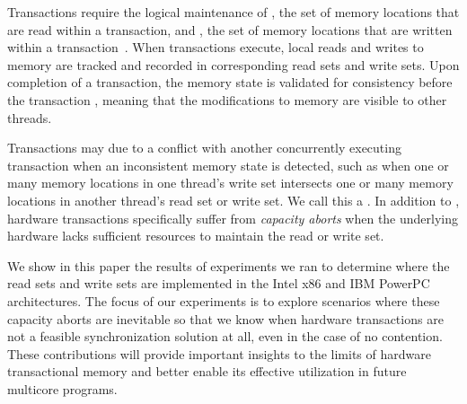 Transactions require the logical 
maintenance of , the set
of memory locations that are read within a 
transaction, and , the set
of memory locations that are written within 
a transaction~\cite{???}. When transactions execute, 
local reads and writes to memory 
are tracked and recorded in
corresponding read sets and write sets. Upon 
completion of a transaction, the memory state is validated for 
consistency before the transaction
, meaning that the modifications to 
memory are visible to other threads.

Transactions may  due to a conflict with
another concurrently executing transaction when an
inconsistent memory state is detected, 
such as when one or many memory locations
in one thread's write set intersects one or 
many memory locations in another
thread's read set or write set.  We call this a
.  In addition to ,
hardware transactions specifically suffer 
from \textit{capacity aborts} when the underlying hardware
lacks sufficient resources to maintain the
read or write set.

We show in this paper the results of experiments 
we ran to determine where the
read sets and write sets are implemented in the 
Intel x86 and IBM PowerPC
architectures. The focus of our experiments is to 
explore scenarios where these
capacity aborts are inevitable so that we know 
when hardware transactions are
not a feasible synchronization solution at all, 
even in the case of no
contention. These contributions will provide 
important insights to the limits of
hardware transactional memory and better enable 
its effective utilization in
future multicore programs.
 
